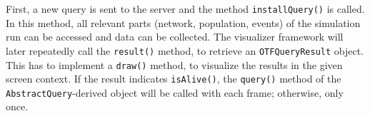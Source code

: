 First, a new query is sent to the server and the method \lstinline|installQuery()| is called. 
In this method, all relevant parts (network, population, events) of the simulation run can be accessed and data can be collected. 
The visualizer framework will later repeatedly call the \lstinline|result()| method, to retrieve an \lstinline|OTFQueryResult| object. 
This has to implement a \lstinline|draw()| method, to visualize the results in the given screen context. 
If the result indicates \lstinline|isAlive()|, the \lstinline|query()| method of the \lstinline|AbstractQuery|-derived object will be called with each frame; otherwise, only once.









